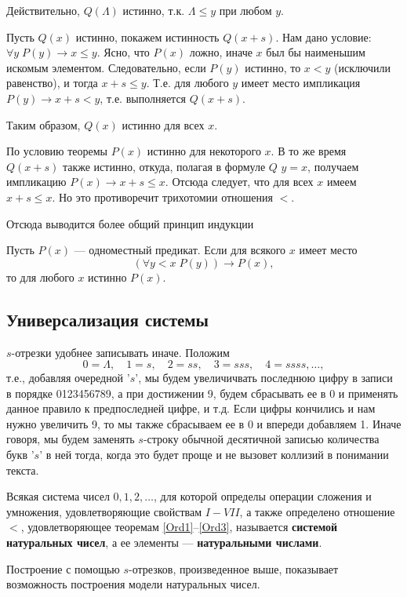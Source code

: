 Действительно, $Q(\Lambda)$ истинно, т.к. $\Lambda\le y$ при любом $y$.

Пусть $Q(x)$ истинно, покажем истинность $Q(x+s)$. Нам дано условие: $\forall y\;P(y)\to x\le y$. Ясно, что $P(x)$ ложно, иначе $x$ был бы наименьшим искомым элементом. Следовательно, если $P(y)$ истинно, то $x<y$ (исключили равенство), и тогда $x+s\le y$. Т.е. для любого $y$ имеет место импликация $P(y)\to x+s<y$, т.е. выполняется $Q(x+s)$.

Таким образом, $Q(x)$ истинно для всех $x$.

По условию теоремы $P(x)$ истинно для некоторого $x$. В то же время $Q(x+s)$ также истинно, откуда, полагая в формуле $Q$ $y=x$, получаем импликацию $P(x)\to x+s\le x$. Отсюда следует, что для всех $x$ имеем $x+s\le x$. Но это противоречит трихотомии отношения $<$.
\epf

Отсюда выводится более общий принцип индукции
\begin{thrm} Пусть $P(x)$ --- одноместный предикат. Если для всякого $x$ имеет место
$$
(\forall y<x\;P(y))\to P(x),
$$
то для любого $x$ истинно $P(x)$.
\end{thrm}


\subsection{Универсализация системы}


$s$-отрезки удобнее записывать иначе. Положим
$$
0=\Lambda,\quad 1=s,\quad 2=ss,\quad 3=sss,\quad 4=ssss,\dots,
$$
т.е., добавляя очередной '$s$', мы будем увеличичвать последнюю цифру в записи в порядке 0123456789, а при достижении 9, будем сбрасывать ее в 0 и применять данное правило к предпоследней цифре, и т.д. Если цифры кончились и нам нужно увеличить 9, то мы также сбрасываем ее в 0 и впереди добавляем 1. Иначе говоря, мы будем заменять $s$-строку обычной десятичной записью количества букв '$s$' в ней тогда, когда это будет проще и не вызовет коллизий в понимании текста.

Всякая система чисел $0,1,2,\dots$, для которой определы операции сложения и умножения, удовлетворяющие свойствам $I-VII$, а также определено отношение $<$, удовлетворяющее теоремам \ref{Ord1}--\ref{Ord3}, называется \textbf{системой натуральных чисел}, а ее элементы --- \textbf{натуральными числами}.

Построение с помощью $s$-отрезков, произведенное выше, показывает возможность построения модели натуральных чисел.

